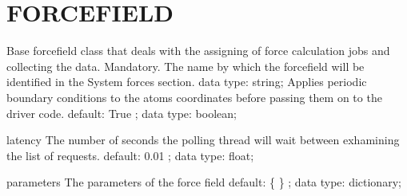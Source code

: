 \section{FORCEFIELD}
\label{FORCEFIELD}
\begin{ipifield}{}%
{Base forcefield class that deals with the assigning of force calculation jobs and collecting the data.}%
{}%
{%
{Mandatory. The name by which the forcefield will be identified in the System forces section.}%
{data type: string; }%
%
{Applies periodic boundary conditions to the atoms coordinates before passing them on to the driver code.}%
{default:  True ; data type: boolean; }%
}
\begin{ipifield}{latency}%
{The number of seconds the polling thread will wait between exhamining the list of requests.}%
{default:  0.01 ; data type: float; }%
{}
\end{ipifield}
\begin{ipifield}{parameters}%
{The parameters of the force field}%
{default:  \{ \} ; data type: dictionary; }%
{}
\end{ipifield}
\end{ipifield}
